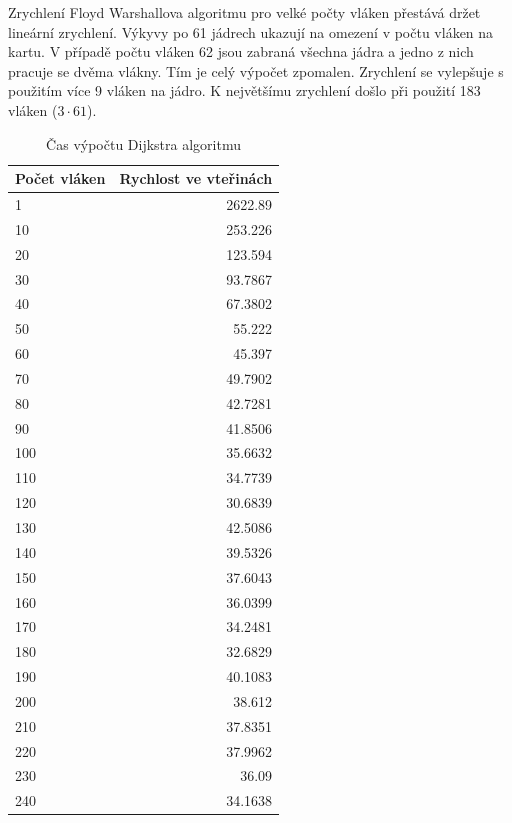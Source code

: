 \documentclass[a4paper,10pt]{article}
\begin{document}
Zrychlení Floyd Warshallova algoritmu pro velké počty vláken přestává držet lineární zrychlení. Výkyvy po 61 jádrech ukazují na omezení v počtu vláken na kartu. V případě počtu vláken 62 jsou zabraná všechna jádra a jedno z nich pracuje se dvěma vlákny. Tím je celý výpočet zpomalen. Zrychlení se vylepšuje s použitím více 9 vláken na jádro. K největšímu zrychlení došlo při použití 183 vláken ($3 \cdot 61$).

\begin{table}[H]
  \centering
	\caption{Čas výpočtu Dijkstra algoritmu}
	\begin{tabular}{| l | r |}
\hline
Počet vláken & Rychlost ve vteřinách \\ \hline
1 & 2622.89 \\ \hline
10 & 253.226 \\ \hline
20 & 123.594 \\ \hline
30 & 93.7867 \\ \hline
40 & 67.3802 \\ \hline
50 & 55.222 \\ \hline
60 & 45.397 \\ \hline
70 & 49.7902 \\ \hline
80 & 42.7281 \\ \hline
90 & 41.8506 \\ \hline
100 & 35.6632 \\ \hline
110 & 34.7739 \\ \hline
120 & 30.6839 \\ \hline
130 & 42.5086 \\ \hline
140 & 39.5326 \\ \hline
150 & 37.6043 \\ \hline
160 & 36.0399 \\ \hline
170 & 34.2481 \\ \hline
180 & 32.6829 \\ \hline
190 & 40.1083 \\ \hline
200 & 38.612 \\ \hline
210 & 37.8351 \\ \hline
220 & 37.9962 \\ \hline
230 & 36.09 \\ \hline
240 & 34.1638 \\ \hline

	\end{tabular}
  \label{tab:daph}
\end{table}
\end{document}
